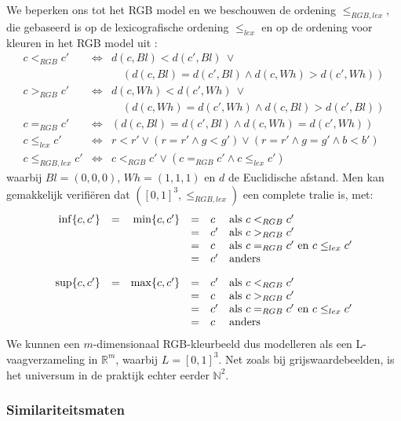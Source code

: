 We beperken ons tot het RGB model en we beschouwen de ordening $\leq_{RGB,lex}$, die
gebaseerd is op de lexicografische ordening $\leq_{lex}$ en op de ordening voor kleuren in het 
RGB model uit \cite{dewitte:vect_morph_ops}:
$$
\begin{array}{rcl}
c <_{RGB} c' & \iff & d(c,Bl) < d(c',Bl)\ \lor \\
			   &	  & \quad(d(c,Bl) = d(c',Bl) \land d(c,Wh) > d(c',Wh)) \\[5pt]
c >_{RGB} c' & \iff & d(c,Wh) < d(c',Wh)\ \lor \\
			   &	  & \quad(d(c,Wh) = d(c',Wh) \land d(c,Bl) > d(c',Bl)) \\[5pt]
c =_{RGB} c'   & \iff & (d(c,Bl) = d(c',Bl) \land d(c,Wh) = d(c',Wh)) \\[10pt]
c \leq_{lex} c' & \iff & r < r' \lor (r = r' \land g < g') \lor (r = r' \land g = g' \land b < b') \\[10pt]
c \leq_{RGB,lex} c' & \iff & c <_{RGB} c' \lor (c =_{RGB} c' \land c \leq_{lex} c')
\end{array}
$$
waarbij $Bl = (0,0,0)$, $Wh = (1,1,1)$ en $d$ de Euclidische afstand.
Men kan gemakkelijk verifi\"eren dat $([0,1]^3,\leq_{RGB,lex})$ een complete tralie is, met:
$$
\begin{array}{@{}c@{}}
\begin{array}{rcrcll}
\inf \{c,c'\} & = & \min \{c,c'\} & = & c & \textrm{als } c <_{RGB} c' \\
		  	& & & = & c' & \textrm{als } c >_{RGB} c' \\
		  	& & & = & c & \textrm{als } c =_{RGB} c' \textrm{ en } c \leq_{lex} c' \\
		  	& & & = & c' & \textrm{anders} \\[10pt]
\sup \{c,c'\} & = & \max \{c,c'\} & = & c' & \textrm{als } c <_{RGB} c' \\
		  	& & & = & c & \textrm{als } c >_{RGB} c' \\
		  	& & & = & c' & \textrm{als } c =_{RGB} c' \textrm{ en } c \leq_{lex} c' \\
		  	& & & = & c & \textrm{anders}
\end{array}
\end{array}
$$
We kunnen een $m$-dimensionaal RGB-kleurbeeld dus modelleren als een L-vaagverzameling in 
$\mathbb{R}^m$, waarbij $L=[0,1]^3$. Net zoals bij grijswaardebeelden, is 
het universum in de praktijk echter eerder $\mathbb{N}^2$.

\subsubsection{Similariteitsmaten}

